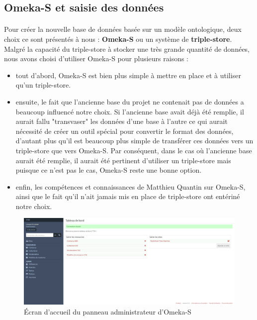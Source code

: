 \subsection{Omeka-S et saisie des données}

\paragraph{} \hspace{10mm}
Pour créer la nouvelle base de données basée sur un modèle ontologique, deux choix ce sont présentés à nous : \textbf{Omeka-S} ou un système de \textbf{triple-store}. Malgré la capacité du triple-store à stocker une très grande quantité de données, nous avons choisi d'utiliser Omeka-S pour plusieurs raisons : 
\begin{itemize}
    \item[\ding{103}] tout d'abord, Omeka-S est bien plus simple à mettre en place et à utiliser qu'un triple-store.
    \item[\ding{103}] ensuite, le fait que l'ancienne base du projet ne contenait pas de données a beaucoup influencé notre choix. Si l'ancienne base avait déjà été remplie, il aurait fallu "transvaser" les données d'une base à l'autre ce qui aurait nécessité de créer un outil spécial pour convertir le format des données, d'autant plus  qu'il est beaucoup plus simple de transférer ces données vers un triple-store que vers Omeka-S. Par conséquent, dans le cas où l'ancienne base aurait été remplie, il aurait été pertinent d'utiliser un triple-store mais puisque ce n'est pas le cas, Omeka-S reste une bonne option.
    \item[\ding{103}] enfin, les compétences et connaissances de Matthieu Quantin sur Omeka-S, ainsi que le fait qu'il n'ait jamais mis en place de triple-store ont entériné notre choix.
\end{itemize}

\begin{figure} [H]
    \centering
    \includegraphics[width=1\textwidth]{assets/omeka/panneau_admin_omekapng.png}
    \caption{Écran d'accueil du panneau administrateur d'Omeka-S}
    \label{fig:panneauAdminOmeka}
\end{figure}

